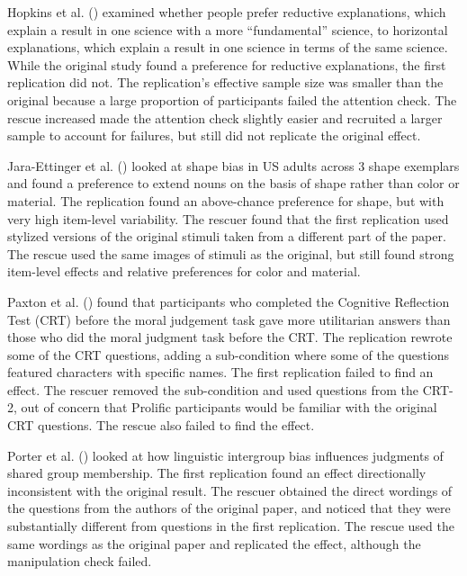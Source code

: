 \documentclass[
  english,
  a4paper,
]{article}
\begin{document}
Hopkins et al. () examined whether people prefer reductive explanations, which explain a result in one science with a more ``fundamental'' science, to horizontal explanations, which explain a result in one science in terms of the same science.
While the original study found a preference for reductive explanations, the first replication did not.
The replication's effective sample size was smaller than the original because a large proportion of participants failed the attention check.
The rescue increased made the attention check slightly easier and recruited a larger sample to account for failures, but still did not replicate the original effect.

Jara-Ettinger et al. () looked at shape bias in US adults across 3 shape exemplars and found a preference to extend nouns on the basis of shape rather than color or material.
The replication found an above-chance preference for shape, but with very high item-level variability.
The rescuer found that the first replication used stylized versions of the original stimuli taken from a different part of the paper.
The rescue used the same images of stimuli as the original, but still found strong item-level effects and relative preferences for color and material.

Paxton et al. () found that participants who completed the Cognitive Reflection Test (CRT) before the moral judgement task gave more utilitarian answers than those who did the moral judgment task before the CRT.
The replication rewrote some of the CRT questions, adding a sub-condition where some of the questions featured characters with specific names.
The first replication failed to find an effect.
The rescuer removed the sub-condition and used questions from the CRT-2, out of concern that Prolific participants would be familiar with the original CRT questions.
The rescue also failed to find the effect.

Porter et al. () looked at how linguistic intergroup bias influences judgments of shared group membership.
The first replication found an effect directionally inconsistent with the original result.
The rescuer obtained the direct wordings of the questions from the authors of the original paper, and noticed that they were substantially different from questions in the first replication.
The rescue used the same wordings as the original paper and replicated the effect, although the manipulation check failed.
\end{document}
